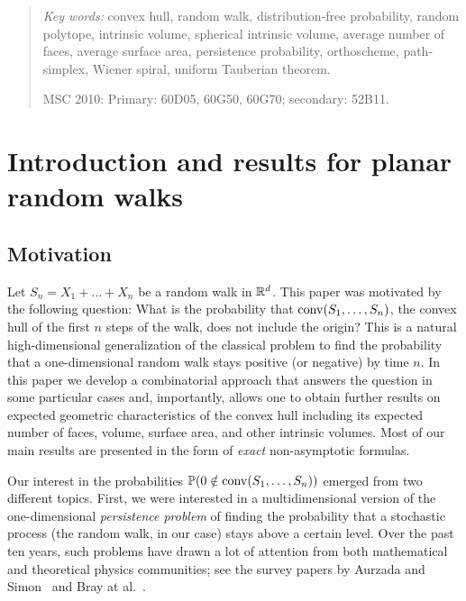 \documentclass[12pt, reqno]{amsart}
\begin{document}
\begin{abstract}
\medskip

{\it Key words:} convex hull, random walk, distribution-free probability, random polytope, intrinsic volume, spherical intrinsic volume, average number of faces, average surface area, persistence probability, orthoscheme, path-simplex, Wiener spiral, uniform Tauberian theorem.

MSC 2010: Primary: 60D05, 60G50, 60G70; secondary: 52B11.
\end{abstract}


\maketitle

\section{Introduction and results for planar random walks} \label{Sec: Intro}

\subsection{Motivation}
Let $S_n = X_1 + \dots + X_n$ be a random walk in $\mathbb{R}^d$. This paper was motivated by the following question: What is the probability that $\mathop{\mathrm{conv}}\nolimits(S_1, \dots, S_n)$, the convex hull of the first $n$ steps of the walk, does not include the origin? This is a natural high-dimensional generalization of the classical problem to find the probability that a one-dimensional random walk stays positive (or negative) by time $n$. In this paper we develop a combinatorial approach that answers the question in some particular cases and, importantly, allows one to obtain further results on expected geometric characteristics of the convex hull including its expected number of faces, volume, surface area, and other intrinsic volumes. Most of our main results are presented in the form of {\it exact} non-asymptotic formulas.

Our interest in the probabilities $\mathbb{P}(0 \notin \mathop{\mathrm{conv}}\nolimits(S_1, \dots, S_n))$ emerged from two different topics. First, we were interested in a multidimensional version of the one-dimensional {\it persistence problem} of finding the probability that a stochastic process (the random walk, in our case) stays above a certain level. Over the past ten years, such problems have drawn a lot of attention from both mathematical and theoretical physics communities; see the survey papers by Aurzada and Simon~\cite{AS} and Bray at al.~\cite{BMS13}. 
\end{document}
